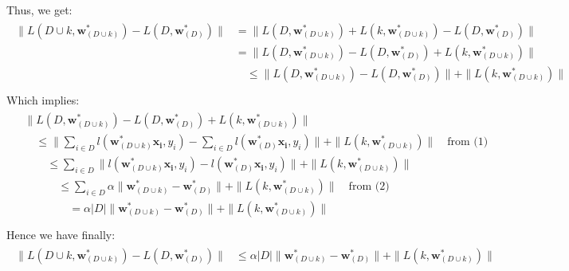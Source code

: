 \documentclass[12pt]{article}
\begin{document}
\noindent Thus, we get:
\begin{gather}
    \begin{aligned}
        \|L(D \cup k, \boldsymbol{w}^{*}_{(D \cup k)}) - L(D,\boldsymbol{w}^{*}_{(D)})\|  \nonumber 
        &= \|L(D, \boldsymbol{w}^{*}_{(D \cup k)}) + L(k, \boldsymbol{w}^{*}_{(D \cup k)}) - L(D,\boldsymbol{w}^{*}_{(D)})\|  \nonumber \\
        &= \|L(D, \boldsymbol{w}^{*}_{(D \cup k)}) - L(D,\boldsymbol{w}^{*}_{(D)}) + L(k, \boldsymbol{w}^{*}_{(D \cup k)}) \|  \nonumber \\
        & \quad \leq \|L(D, \boldsymbol{w}^{*}_{(D \cup k)}) - L(D,\boldsymbol{w}^{*}_{(D)})\| + \| L(k, \boldsymbol{w}^{*}_{(D \cup k)}) \|  \nonumber \\
    \end{aligned}
\end{gather}
Which implies: 
\begin{gather}
    \begin{aligned}
        &\|L(D, \boldsymbol{w}^{*}_{(D \cup k)}) - L(D,\boldsymbol{w}^{*}_{(D)}) + L(k, \boldsymbol{w}^{*}_{(D \cup k)}) \| \\
        & \quad \leq \|\sum_{i\in D} l(\boldsymbol{w}^{*}_{(D \cup k)}\boldsymbol{x_i},y_i)  - \sum_{i\in D} l(\boldsymbol{w}^{*}_{(D)}\boldsymbol{x_i},y_i) \| + \| L(k, \boldsymbol{w}^{*}_{(D \cup k)}) \|  \quad \text{from (1)}\nonumber \\
        & \quad \quad \leq \sum_{i\in D} \|l(\boldsymbol{w}^{*}_{(D \cup k)}\boldsymbol{x_i},y_i)  - l(\boldsymbol{w}^{*}_{(D)}\boldsymbol{x_i},y_i) \| + \| L(k, \boldsymbol{w}^{*}_{(D \cup k)}) \|  \nonumber \\
        & \quad \quad \quad \leq \sum_{i\in D}\alpha\|\boldsymbol{w}^{*}_{(D \cup k)} - \boldsymbol{w}^{*}_{(D)} \| + \| L(k, \boldsymbol{w}^{*}_{(D \cup k)}) \|  \quad \text{from (2)} \nonumber \\
        &\quad \quad \quad \quad =\alpha|D|\|\boldsymbol{w}^{*}_{(D \cup k)} - \boldsymbol{w}^{*}_{(D)} \| + \| L(k, \boldsymbol{w}^{*}_{(D \cup k)}) \|  \nonumber \\
    \end{aligned}
\end{gather}
Hence we have finally:
\begin{gather}
    \begin{aligned}
        \|L(D \cup k, \boldsymbol{w}^{*}_{(D \cup k)}) - L(D,\boldsymbol{w}^{*}_{(D)})\|  \nonumber 
        & \leq \alpha|D|\|\boldsymbol{w}^{*}_{(D \cup k)} - \boldsymbol{w}^{*}_{(D)} \| + \| L(k, \boldsymbol{w}^{*}_{(D \cup k)}) \|  \nonumber \\
    \end{aligned}
\end{gather}
\end{document}
